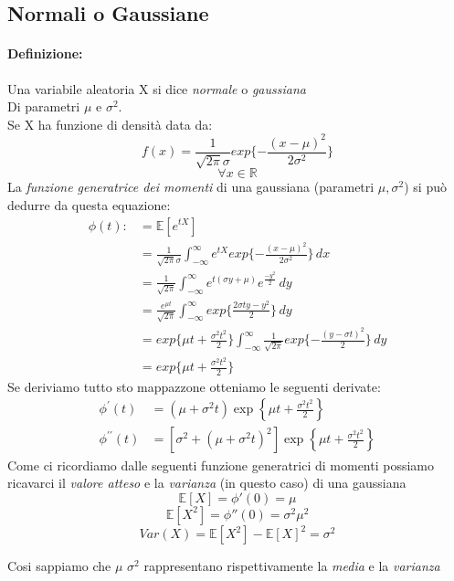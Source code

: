 \documentclass[]{article}
\newcommand{\ev}{\mathbb{E}[X]}
\renewcommand{\ev}[1]{\mathbb{E}[#1]}
\newcommand{\definizione}{\paragraph{Definizione:}}
\begin{document}
    \subsection{Normali o Gaussiane}
    \definizione Una variabile aleatoria X si dice \textit{normale} o \textit{gaussiana} \\ 
    Di parametri $\mu$ e $\sigma^2$. \\
    Se X ha funzione di densità data da:
    \[ f(x) = \frac{1}{\sqrt{2 \pi} \sigma} exp\{- \frac{(x - \mu)^2}{2 \sigma^2}\} \]
    \[ \forall x \in \mathbb{R} \]
    La \textit{funzione generatrice dei momenti} di una gaussiana (parametri $\mu, \sigma^2$) si può dedurre da questa equazione:
    \begin{equation*}
        \begin{split}
            \phi(t) :&= \ev{e^{tX}} \\
            & = \frac{1}{\sqrt{2\pi} \sigma} \int_{-\infty}^{\infty} e^{tX} exp\{ - \frac{(x - \mu)^2}{2 \sigma^2}\} \, dx \\
            & = \frac{1}{\sqrt{2\pi}} \int_{-\infty}^{\infty} e^{t(\sigma y + \mu)} e^{\frac{-y^2}{2}} \, dy \\
            & = \frac{e^{\mu t}}{\sqrt{2 \pi}} \int_{-\infty}^{\infty} exp \{ \frac{2 \sigma ty - y^2}{2}\} \, dy \\
            & = exp\{ \mu t + \frac{\sigma^2 t^2}{2}\} \int_{-\infty}^{\infty} \frac{1}{\sqrt{2 \pi}} exp \{ - \frac{(y - \sigma t)^2}{2}\} \, dy \\
            & = exp \{ \mu t + \frac{\sigma^2 t^2}{2}\}
        \end{split}
    \end{equation*}
    Se deriviamo tutto sto mappazzone otteniamo le seguenti derivate:
    \begin{equation}
        \begin{aligned}
        \phi^{\prime}(t) & =\left(\mu+\sigma^2 t\right) \exp \left\{\mu t+\frac{\sigma^2 t^2}{2}\right\} \\
        \phi^{\prime \prime}(t) & =\left[\sigma^2+\left(\mu+\sigma^2 t\right)^2\right] \exp \left\{\mu t+\frac{\sigma^2 t^2}{2}\right\}
        \end{aligned}
    \end{equation}
    Come ci ricordiamo dalle seguenti funzione generatrici di momenti possiamo ricavarci il \textit{valore atteso} e la \textit{varianza} (in questo caso) di una gaussiana 
    \[ \ev{X} = \phi'(0) = \mu \]
    \[ \ev{X^2} = \phi''(0) = \sigma^2 \mu^2 \]
    \[ Var(X) = \ev{X^2} - \ev{X}^2 = \sigma^2 \]
    \centerline{Cosi sappiamo che $\mu$ $\sigma^2$ rappresentano rispettivamente la \textit{media} e la \textit{varianza}}
\end{document}
